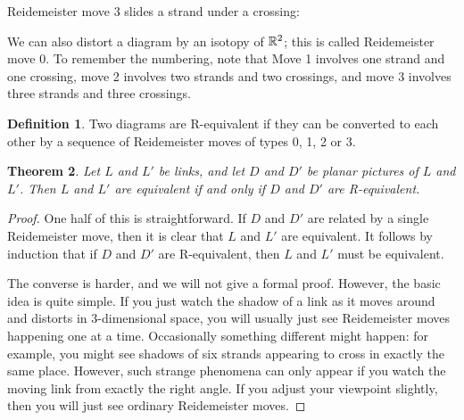 \documentclass[reqno]{amsart}
\newtheorem{theorem}{Theorem}[section]
\theoremstyle{definition}
\newtheorem{definition}[theorem]{Definition}
\begin{document}
Reidemeister move 3 slides a strand under a crossing:
\begin{center}
\end{center}

We can also distort a diagram by an isotopy of $\mathbb{R}^2$; this is called
Reidemeister move $0$.  To remember the numbering, note that
Move 1 involves one strand and one crossing, move 2 involves two
strands and two crossings, and move 3 involves three strands and three
crossings.  

\begin{definition}
 Two diagrams are R-equivalent if they can be converted to each other
 by a sequence of Reidemeister moves of types 0, 1, 2 or 3.
\end{definition}

\begin{theorem}
 Let $L$ and $L'$ be links, and let $D$ and $D'$ be planar pictures of
 $L$ and $L'$.  Then $L$ and $L'$ are equivalent if and only if $D$
 and $D'$ are R-equivalent.
\end{theorem}
\begin{proof}
 One half of this is straightforward.  If $D$ and $D'$ are related by a
 single Reidemeister move, then it is clear that $L$ and $L'$ are
 equivalent.  It follows by induction that if $D$ and $D'$ are
 R-equivalent, then $L$ and $L'$ must be equivalent.  

 The converse is harder, and we will not give a formal proof.
 However, the basic idea is quite simple.  If you just watch the
 shadow of a link as it moves around and distorts in $3$-dimensional
 space, you will usually just see Reidemeister moves happening one at
 a time.  Occasionally something different might happen: for example,
 you might see shadows of six strands appearing to cross in exactly
 the same place.  However, such strange phenomena can only appear if
 you watch the moving link from exactly the right angle.  If you
 adjust your viewpoint slightly, then you will just see ordinary
 Reidemeister moves.
\end{proof}
\end{document}
